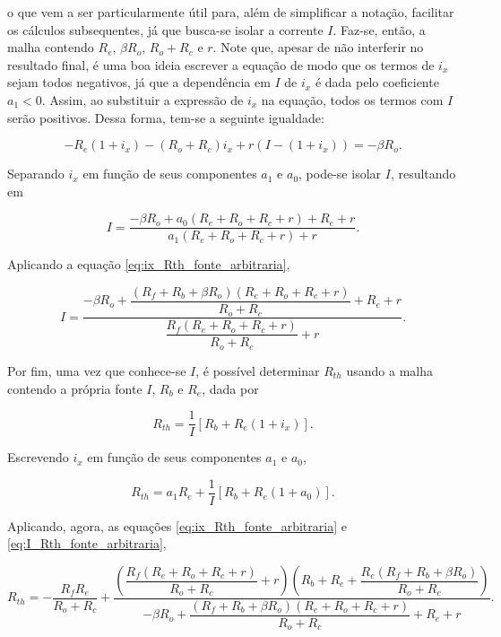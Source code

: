 \documentclass{article}
\numberwithin{equation}{section}
\let\dfr\dfrac
\begin{document}
\noindent o que vem a ser particularmente útil para, além de simplificar a notação, facilitar os cálculos subsequentes, já que busca-se isolar a corrente $I$. Faz-se, então, a malha contendo $R_e$, $\beta R_o$, $R_o + R_c$ e $r$. Note que, apesar de não interferir no resultado final, é uma boa ideia escrever a equação de modo que os termos de $i_x$ sejam todos negativos, já que a dependência em $I$ de $i_x$ é dada pelo coeficiente $a_1 < 0$. Assim, ao substituir a expressão de $i_x$ na equação, todos os termos com $I$ serão positivos. Dessa forma, tem-se a seguinte igualdade:

\begin{equation*}
    -R_e(1+i_x)-(R_o+R_c)i_x+r(I-(1+i_x)) = -\beta R_o.
\end{equation*}

\noindent Separando $i_x$ em função de seus componentes $a_1$ e $a_0$, pode-se isolar $I$, resultando em

\begin{equation*}
    I=\dfr{-\beta R_o + a_0 (R_e+R_o+R_c+r) + R_e+r}{a_1 (R_e+R_o+R_c+r)+r}.
\end{equation*}

\noindent Aplicando a equação \eqref{eq:ix_Rth_fonte_arbitraria},

\begin{equation}
    I=\dfr{-\beta R_o + \dfr{(R_f+R_b+\beta R_o)(R_e+R_o+R_c+r)}{R_o+R_c} + R_e+r}{\dfr{R_{f}(R_e+R_o+R_c+r)}{R_o+R_c}+r}. \label{eq:I_Rth_fonte_arbitraria}
\end{equation}

\noindent Por fim, uma vez que conhece-se $I$, é possível determinar $R_{th}$ usando a malha contendo a própria fonte $I$, $R_b$ e $R_e$, dada por

\begin{equation*}
    R_{th} = \dfr{1}{I} [R_b + R_e(1+i_x)].
\end{equation*}

\noindent Escrevendo $i_x$ em função de seus componentes $a_1$ e $a_0$,

\begin{equation*}
    R_{th} = a_1 R_e + \dfr{1}{I} [R_b + R_e(1+a_0)].
\end{equation*}

\noindent Aplicando, agora, as equações \eqref{eq:ix_Rth_fonte_arbitraria} e \eqref{eq:I_Rth_fonte_arbitraria},

\begin{equation}
    R_{th}= -\dfr{R_{f}R_e}{R_o+R_c} + \dfr{\left(\dfr{R_{f}(R_e+R_o+R_c+r)}{R_o+R_c}+r\right)\left(R_b+R_e + \dfr{R_e(R_{f}+R_b+\beta R_o)}{R_o + R_c}\right)}{-\beta R_o + \dfr{(R_f+R_b+\beta R_o)(R_e+R_o+R_c+r)}{R_o+R_c} + R_e+r}.
\end{equation}
\end{document}
